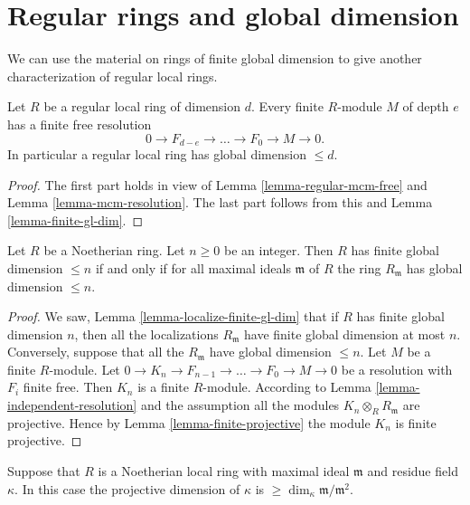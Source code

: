 \section{Regular rings and global dimension}
\label{section-regular-finite-gl-dim}

\noindent
We can use the material on rings of finite global dimension
to give another characterization of regular local rings.

\begin{proposition}
\label{proposition-regular-finite-gl-dim}
Let $R$ be a regular local ring of dimension $d$.
Every finite $R$-module $M$ of depth $e$ has a finite free
resolution
$$
0 \to F_{d-e} \to \ldots \to F_0 \to M \to 0.
$$
In particular a regular local ring has global dimension $\leq d$.
\end{proposition}

\begin{proof}
The first part holds in view of Lemma \ref{lemma-regular-mcm-free}
and Lemma \ref{lemma-mcm-resolution}. The last part follows from this
and Lemma \ref{lemma-finite-gl-dim}.
\end{proof}

\begin{lemma}
\label{lemma-finite-gl-dim-primes}
Let $R$ be a Noetherian ring. Let $n \geq 0$ be an integer.
Then $R$ has finite global dimension $\leq n$ if and
only if for all maximal ideals $\mathfrak m$ of $R$
the ring $R_{\mathfrak m}$ has global dimension $\leq n$.
\end{lemma}

\begin{proof}
We saw, Lemma \ref{lemma-localize-finite-gl-dim}
that if $R$ has finite global dimension $n$,
then all the localizations $R_{\mathfrak m}$
have finite global dimension at most $n$.
Conversely, suppose that all the $R_{\mathfrak m}$
have global dimension $\leq n$. Let $M$ be a finite
$R$-module. Let
$0 \to K_n \to F_{n-1} \to \ldots \to F_0 \to M \to 0$
be a resolution with $F_i$ finite free.
Then $K_n$ is a finite $R$-module.
According to
Lemma \ref{lemma-independent-resolution}
and the assumption all the modules $K_n \otimes_R R_{\mathfrak m}$
are projective. Hence by
Lemma \ref{lemma-finite-projective}
the module $K_n$ is finite projective.
\end{proof}

\begin{lemma}
\label{lemma-length-resolution-residue-field}
Suppose that $R$ is a Noetherian local ring
with maximal ideal $\mathfrak m$ and
residue field $\kappa$. In this case
the projective dimension of $\kappa$ is
$\geq \dim_\kappa \mathfrak m / \mathfrak m^2$.
\end{lemma}

